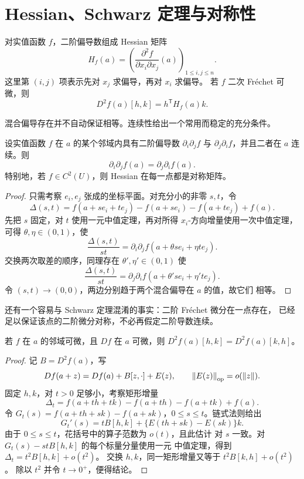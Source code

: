\section{Hessian、Schwarz 定理与对称性}

对实值函数 \(f\)，二阶偏导数组成 Hessian 矩阵
\[
 H_f(a)=\left(\frac{\partial^2f}{\partial x_i\partial x_j}(a)
 \right)_{1\le i,j\le n}.
\]
这里第 \((i,j)\) 项表示先对 \(x_j\) 求偏导，再对 \(x_i\) 求偏导。
若 \(f\) 二次 Fréchet 可微，则
\[
 D^2f(a)[h,k]=h^{\mathsf T}H_f(a)k.
\]

混合偏导存在并不自动保证相等。连续性给出一个常用而稳定的充分条件。

\begin{theorem}[Schwarz 定理]
\label{thm:schwarz-mixed-partials}
设实值函数 \(f\) 在 \(a\) 的某个邻域内具有二阶偏导数
\(\partial_i\partial_jf\) 与 \(\partial_j\partial_if\)，并且二者在
\(a\) 连续。则
\[
 \partial_i\partial_jf(a)=\partial_j\partial_if(a).
\]
特别地，若 \(f\in C^2(U)\)，则 Hessian 在每一点都是对称矩阵。
\end{theorem}

\begin{proof}
只需考察 \(e_i,e_j\) 张成的坐标平面。对充分小的非零 \(s,t\)，令
\[
 \Delta(s,t)=f(a+se_i+te_j)-f(a+se_i)-f(a+te_j)+f(a).
\]
先把 \(s\) 固定，对 \(t\) 使用一元中值定理，再对所得
\(x_i\)-方向增量使用一次中值定理，可得 \(\theta,\eta\in(0,1)\)，使
\[
 \frac{\Delta(s,t)}{st}
 =\partial_i\partial_jf(a+\theta se_i+\eta te_j).
\]
交换两次取差的顺序，同理存在 \(\theta',\eta'\in(0,1)\) 使
\[
 \frac{\Delta(s,t)}{st}
 =\partial_j\partial_if(a+\theta' se_i+\eta' te_j).
\]
令 \((s,t)\to(0,0)\)，两边分别趋于两个混合偏导在 \(a\) 的值，故它们
相等。
\end{proof}

还有一个容易与 Schwarz 定理混淆的事实：二阶 Fréchet 微分在一点存在，
已经足以保证该点的二阶微分对称，不必再假定二阶导数连续。

\begin{proposition}[二阶微分的对称性]
\label{prop:second-frechet-symmetry}
若 \(f\) 在 \(a\) 的邻域可微，且 \(Df\) 在 \(a\) 可微，则
\(D^2f(a)[h,k]=D^2f(a)[k,h]\)。
\end{proposition}

\begin{proof}
记 \(B=D^2f(a)\)，写
\[
 Df(a+z)=Df(a)+B[z,\cdot]+E(z),
 \qquad \left\lVert E(z)\right\rVert_{\mathrm{op}}=o(\left\lVert z\right\rVert).
\]
固定 \(h,k\)，对 \(t>0\) 足够小，考察矩形增量
\[
 \Delta_t=f(a+th+tk)-f(a+th)-f(a+tk)+f(a).
\]
令 \(G_t(s)=f(a+th+sk)-f(a+sk)\)，\(0\le s\le t\)。链式法则给出
\[
 G_t'(s)=tB[h,k]+\{E(th+sk)-E(sk)\}k.
\]
由于 \(0\le s\le t\)，花括号中的算子范数为 \(o(t)\)，且此估计
对 \(s\) 一致。对 \(G_t(s)-stB[h,k]\) 的每个标量分量使用一元
中值定理，得到 \(\Delta_t=t^2B[h,k]+o(t^2)\)。
交换 \(h,k\)，同一矩形增量又等于 \(t^2B[k,h]+o(t^2)\)。
除以 \(t^2\) 并令 \(t\to0^+\)，便得结论。
\end{proof}

